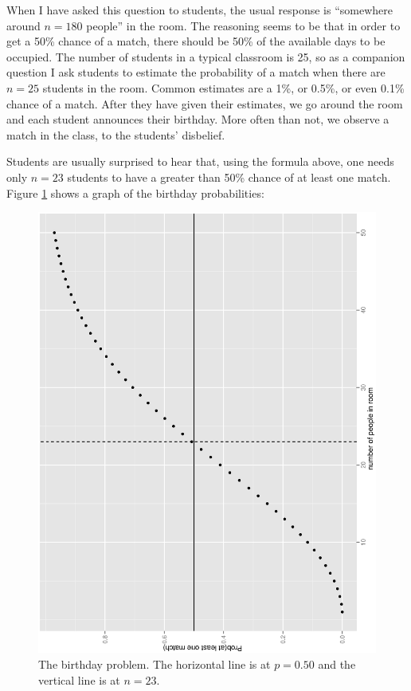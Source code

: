 \documentclass[captions=tableheading]{scrbook}
\begin{document}
\begin{example}
When I have asked this question to students, the usual response is ``somewhere around \(n=180\) people'' in the room. The reasoning seems to be that in order to get a 50\% chance of a match, there should be 50\% of the available days to be occupied. The number of students in a typical classroom is 25, so as a companion question I ask students to estimate the probability of a match when there are \(n=25\) students in the room. Common estimates are a 1\%, or 0.5\%, or even 0.1\% chance of a match. After they have given their estimates, we go around the room and each student announces their birthday. More often than not, we observe a match in the class, to the students' disbelief.

Students are usually surprised to hear that, using the formula above, one needs only \(n=23\) students to have a greater than 50\% chance of at least one match. Figure \ref{fig-birthday} shows a graph of the birthday probabilities:
\end{example}







\begin{figure}[th]
  \includegraphics[angle=270, totalheight=4in]{ps/prob/birthday.ps}
  \caption[The birthday problem]{\small The birthday problem. The horizontal line is at \(p=0.50\) and the vertical line is at \(n=23\).}
  \label{fig-birthday}
\end{figure}
\end{document}
